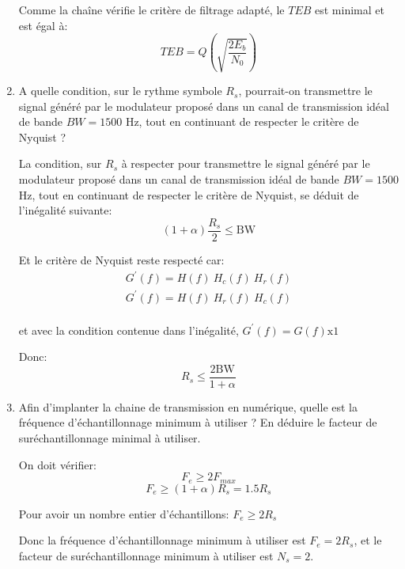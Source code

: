 \documentclass[frenchb]{article}
\begin{document}
\begin{enumerate}
        Comme la chaîne vérifie le critère de filtrage adapté, le $TEB$ est minimal et est égal à: $$ \boxed{TEB = Q\left(\sqrt{\frac{2 E_b}{N_0}}\right)}$$
        
        \par\leavevmode\par
        
        \item A quelle condition, sur le rythme symbole $R_s$, pourrait-on transmettre le signal généré par le modulateur proposé dans un canal de transmission idéal de bande $BW=1500$ Hz, tout en continuant de respecter le critère de Nyquist ?
        \par\leavevmode\par
        \setlength\parindent{0.5cm}
        La condition, sur $R_s$ à respecter pour transmettre le signal généré par le modulateur proposé dans un canal de transmission idéal de bande $BW=1500$ Hz, tout en continuant de respecter le critère de Nyquist, se déduit de l'inégalité suivante:
        $$ (1 + \alpha) \frac{R_s}{2} \leq \text{BW} $$
        
        Et le critère de Nyquist reste respecté car:
        \begin{equation*}
        \begin{split}
        G^\prime(f)  = H(f) \ H_c(f) \ H_r(f) \\
        G^\prime(f)  = H(f) \ H_r(f) \ H_c(f)  \\
        \end{split}
        \end{equation*}
        
        \setlength\parindent{3cm}
        et avec la condition contenue dans l'inégalité,
        $G^\prime(f)  = G(f) \mathrm{x} 1 $
        
        \setlength\parindent{0.5cm}
        Donc:
        $$\boxed{R_s \leq \frac{2 \text{BW}}{1 + \alpha}}$$
        \par\leavevmode\par
        \item Afin d'implanter la chaine de transmission en numérique, quelle est la fréquence d'échantillonnage minimum à utiliser ? En déduire le facteur de suréchantillonnage minimal à utiliser.
        \par\leavevmode\par
        \setlength\parindent{0.5cm}
        On doit vérifier: 
        $$ F_e \geq 2 F_{max}$$
        $$ F_e \geq (1 + \alpha) R_s = 1.5 R_s $$
        
        Pour avoir un nombre entier d'échantillons: $F_e\geq 2 R_s$
        
        Donc la fréquence d'échantillonnage minimum à utiliser est $\boxed{F_e = 2 R_s}$, et le facteur de suréchantillonnage minimum à utiliser est $\boxed{N_s = 2}$. 
        
           
    \end{enumerate}
\end{document}
